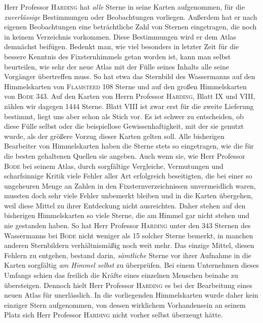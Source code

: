Herr Professor \textsc{Harding} hat \emph{alle} Sterne in seine Karten aufgenommen, für die \emph{zuverlässige} Bestimmungen oder Beobachtungen vorliegen. Außerdem hat er nach eigenen Beobachtungen eine beträchtliche Zahl von Sternen eingetragen, die noch in keinem Verzeichnis vorkommen. Diese Bestimmungen wird er dem Atlas demnächst beifügen. Bedenkt man, wie viel besonders in letzter Zeit für die bessere Kenntnis des Fixsternhimmels getan worden ist, kann man selbst beurteilen, wie sehr der neue Atlas mit der Fülle seines Inhalts alle seine Vorgänger übertreffen muss. So hat etwa das Sternbild des Wassermanns auf den Himmelskarten von \textsc{Flamsteed} 108 Sterne und auf den großen Himmelskarten von \textsc{Bode} 343. Auf den Karten von Herrn Professor \textsc{Harding}, Blatt IX und VIII, zählen wir dagegen 1444 Sterne. Blatt VIII ist zwar erst für die zweite Lieferung bestimmt, liegt uns aber schon als Stich vor. Es ist schwer zu entscheiden, ob diese Fülle selbst oder die beispiellose Gewissenhaftigkeit, mit der sie genutzt wurde, als der größere Vorzug dieser Karten gelten soll. Alle bisherigen Bearbeiter von Himmelskarten haben die Sterne stets so eingetragen, wie die für die besten gehaltenen Quellen sie angeben. Auch wenn sie, wie Herr Professor \textsc{Bode} bei seinem Atlas, durch sorgfältige Vergleiche, Vermutungen und scharfsinnige Kritik viele Fehler aller Art erfolgreich beseitigten, die bei einer so ungeheuren Menge an Zahlen in den Fixsternverzeichnissen unvermeidlich waren, mussten doch sehr viele Fehler unbemerkt bleiben und in die Karten übergehen, weil diese Mittel zu ihrer Entdeckung nicht ausreichten. Daher stehen auf den bisherigen Himmelskarten so viele Sterne, die am Himmel gar nicht stehen und nie gestanden haben. So hat Herr Professor \textsc{Harding} unter den 343 Sternen des Wassermanns bei \textsc{Bode} nicht weniger als 15 solcher Sterne bemerkt, in manchen anderen Sternbildern verhältnismäßig noch weit mehr. Das einzige Mittel, diesen Fehlern zu entgehen, bestand darin, \emph{sämtliche} Sterne vor ihrer Aufnahme in die Karten sorgfältig \emph{am Himmel selbst} zu überprüfen. Bei einem Unternehmen dieses Umfangs schien das freilich die Kräfte eines einzelnen Menschen beinahe zu übersteigen. Dennoch hielt Herr Professor \textsc{Harding} es bei der Bearbeitung eines neuen Atlas für unerlässlich. In die vorliegenden Himmelskarten wurde daher kein einziger Stern aufgenommen, von dessen wirklichem Vorhandensein an seinem Platz sich Herr Professor \textsc{Harding} nicht vorher selbst überzeugt hätte.

